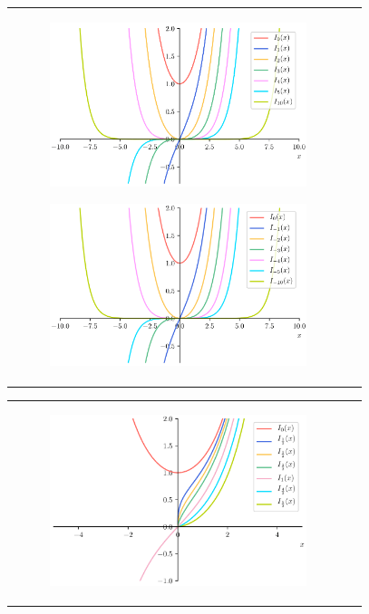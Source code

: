 \documentclass[../main/main]{subfiles}
\begin{document}
\begin{figure}[tb]
\begin{tabular}{cc}
\hspace{-24pt}
 \begin{minipage}{0.50\hsize}\small
    \begin{figure}[H]
      \centering
      \includegraphics[width=75mm]{../fig/bessel/mod_bessel_n.png}
    \end{figure}
 \end{minipage}

 \begin{minipage}{0.50\hsize}
    \begin{figure}[H]
      \centering
      \includegraphics[width=75mm]{../fig/bessel/mod_bessel_n_minus.png}
    \end{figure}
 \end{minipage}
\end{tabular}

\begin{tabular}{cc}
\hspace{-22pt}
 \begin{minipage}{0.50\hsize}
    \begin{figure}[H]
      \centering
      \includegraphics[width=75mm]{../fig/bessel/mod_bessel_nu.png}
    \end{figure}
 \end{minipage}


\end{tabular}
\end{figure}
\end{document}
